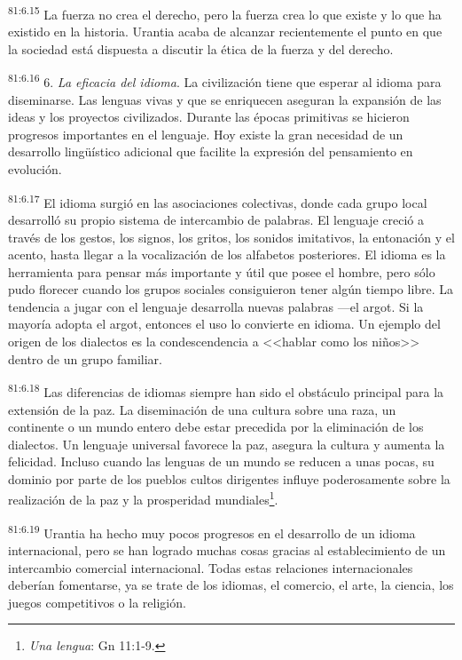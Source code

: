 \documentclass[twoside, 11pt]{book}
\begin{document}
\par
\textsuperscript{81:6.15} La fuerza no crea el derecho, pero la fuerza crea lo que existe y lo que ha existido en la historia. Urantia acaba de alcanzar recientemente el punto en que la sociedad está dispuesta a discutir la ética de la fuerza y del derecho.

\par
\textsuperscript{81:6.16} 6. \textit{La eficacia del idioma}. La civilización tiene que esperar al idioma para diseminarse. Las lenguas vivas y que se enriquecen aseguran la expansión de las ideas y los proyectos civilizados. Durante las épocas primitivas se hicieron progresos importantes en el lenguaje. Hoy existe la gran necesidad de un desarrollo ling\"uístico adicional que facilite la expresión del pensamiento en evolución.

\par
\textsuperscript{81:6.17} El idioma surgió en las asociaciones colectivas, donde cada grupo local desarrolló su propio sistema de intercambio de palabras. El lenguaje creció a través de los gestos, los signos, los gritos, los sonidos imitativos, la entonación y el acento, hasta llegar a la vocalización de los alfabetos posteriores. El idioma es la herramienta para pensar más importante y útil que posee el hombre, pero sólo pudo florecer cuando los grupos sociales consiguieron tener algún tiempo libre. La tendencia a jugar con el lenguaje desarrolla nuevas palabras ---el argot. Si la mayoría adopta el argot, entonces el uso lo convierte en idioma. Un ejemplo del origen de los dialectos es la condescendencia a <<hablar como los niños>> dentro de un grupo familiar.

\par
\textsuperscript{81:6.18} Las diferencias de idiomas siempre han sido el obstáculo principal para la extensión de la paz. La diseminación de una cultura sobre una raza, un continente o un mundo entero debe estar precedida por la eliminación de los dialectos. Un lenguaje universal favorece la paz, asegura la cultura y aumenta la felicidad. Incluso cuando las lenguas de un mundo se reducen a unas pocas, su dominio por parte de los pueblos cultos dirigentes influye poderosamente sobre la realización de la paz y la prosperidad mundiales\footnote{\textit{Una lengua}: Gn 11:1-9.}.

\par
\textsuperscript{81:6.19} Urantia ha hecho muy pocos progresos en el desarrollo de un idioma internacional, pero se han logrado muchas cosas gracias al establecimiento de un intercambio comercial internacional. Todas estas relaciones internacionales deberían fomentarse, ya se trate de los idiomas, el comercio, el arte, la ciencia, los juegos competitivos o la religión.
\end{document}

